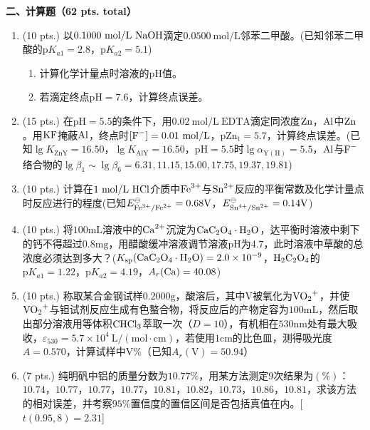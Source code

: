 \vspace{0.5cm}
\noindent\textbf{二、计算题（62 pts. total）}

\begin{enumerate}[label=\arabic*., itemsep=1.5ex]
    \item (10 pts.) 以$0.1000\ \mathrm{mol/L}\ \ce{NaOH}$滴定$0.0500\ \mathrm{mol/L}$邻苯二甲酸。(已知邻苯二甲酸的$\mathrm{p}K_{a1}=2.8$，$\mathrm{p}K_{a2}=5.1$)
    \begin{enumerate}[label=(\arabic*), noitemsep, topsep=0pt, partopsep=0pt]
        \item 计算化学计量点时溶液的pH值。
        \item 若滴定终点$\mathrm{pH}=7.6$，计算终点误差。
    \end{enumerate}
    \item (15 pts.) 在$\mathrm{pH}=5.5$的条件下，用$0.02\ \mathrm{mol/L}\ \mathrm{EDTA}$滴定同浓度$\ce{Zn}$，$\ce{Al}$中$\ce{Zn}$。用$\ce{KF}$掩蔽$\ce{Al}$，终点时$[\ce{F^-}]=0.01\ \mathrm{mol/L}$，$\mathrm{pZn_{t}}=5.7$，计算终点误差。(已知$\lg K_{\mathrm{ZnY}}=16.50$，$\lg K_{\mathrm{AlY}}=16.50$，$\mathrm{pH}=5.5$时$\lg\alpha_{\mathrm{Y(H)}}=5.5$，$\ce{Al}$与$\ce{F^-}$络合物的$\lg\beta_1 \sim \lg\beta_6 = 6.31, 11.15, 15.00, 17.75, 19.37, 19.81$)
    \item (10 pts.) 计算在$1\ \mathrm{mol/L}\ \ce{HCl}$介质中$\ce{Fe^{3+}}$与$\ce{Sn^{2+}}$反应的平衡常数及化学计量点时反应进行的程度(已知$E^\ominus_{\ce{Fe^{3+}/Fe^{2+}}}=0.68\mathrm{V}$，$E^\ominus_{\ce{Sn^{4+}/Sn^{2+}}}=0.14\mathrm{V}$)
    \item (10 pts.) 将$100\mathrm{mL}$溶液中的$\ce{Ca^{2+}}$沉淀为$\ce{CaC_{2}O_{4}\cdot H_{2}O}$，达平衡时溶液中剩下的钙不得超过$0.8\mathrm{mg}$，用醋酸缓冲溶液调节溶液$\mathrm{pH}$为$4.7$，此时溶液中草酸的总浓度必须达到多大？($K_{\mathrm{sp}}(\ce{CaC_{2}O_{4}\cdot H_{2}O})=2.0\times10^{-9}$，$\ce{H_{2}C_{2}O_{4}}$的$\mathrm{p}K_{a1}=1.22$，$\mathrm{p}K_{a2}=4.19$，$A_r(\ce{Ca})=40.08$)
    \item (10 pts.) 称取某合金钢试样$0.2000\mathrm{g}$，酸溶后，其中$\mathrm{V}$被氧化为$\ce{VO_2^+}$，并使$\ce{VO_2^+}$与钽试剂反应生成有色螯合物，将反应后的产物定容为$100\mathrm{mL}$，然后取出部分溶液用等体积$\ce{CHCl_{3}}$萃取一次（$D=10$），有机相在$530\mathrm{nm}$处有最大吸收，$\varepsilon_{530}=5.7\times10^4\ \mathrm{L/(mol\cdot cm)}$，若使用$1\mathrm{cm}$的比色皿，测得吸光度$A=0.570$，计算试样中$\mathrm{V\%}$（已知$A_r(\mathrm{V})=50.94$）
    \item (7 pts.) 纯明矾中铝的质量分数为$10.77\%$，用某方法测定$9$次结果为$(\%)$：$10.74$，$10.77$，$10.77$，$10.77$，$10.81$，$10.82$，$10.73$，$10.86$，$10.81$，求该方法的相对误差，并考察$95\%$置信度的置信区间是否包括真值在内。[$t(0.95,8)=2.31$]
\end{enumerate}